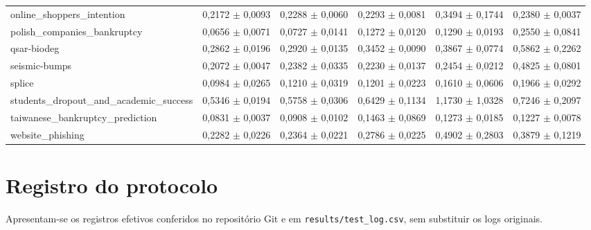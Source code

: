 \documentclass[11pt,a4paper]{article}
\begin{document}
\begin{table}[htbp]
{\begin{tabular}{@{}lrrrrr@{}}
        online\_shoppers\_intention & 0,2172 $\pm$ 0,0093 & 0,2288 $\pm$ 0,0060 & 0,2293 $\pm$ 0,0081 & 0,3494 $\pm$ 0,1744 & 0,2380 $\pm$ 0,0037 \\
        polish\_companies\_bankruptcy & 0,0656 $\pm$ 0,0071 & 0,0727 $\pm$ 0,0141 & 0,1272 $\pm$ 0,0120 & 0,1290 $\pm$ 0,0193 & 0,2550 $\pm$ 0,0841 \\
        qsar-biodeg & 0,2862 $\pm$ 0,0196 & 0,2920 $\pm$ 0,0135 & 0,3452 $\pm$ 0,0090 & 0,3867 $\pm$ 0,0774 & 0,5862 $\pm$ 0,2262 \\
        seismic-bumps & 0,2072 $\pm$ 0,0047 & 0,2382 $\pm$ 0,0335 & 0,2230 $\pm$ 0,0137 & 0,2454 $\pm$ 0,0212 & 0,4825 $\pm$ 0,0801 \\
        splice & 0,0984 $\pm$ 0,0265 & 0,1210 $\pm$ 0,0319 & 0,1201 $\pm$ 0,0223 & 0,1610 $\pm$ 0,0606 & 0,1966 $\pm$ 0,0292 \\
        students\_dropout\_and\_academic\_success & 0,5346 $\pm$ 0,0194 & 0,5758 $\pm$ 0,0306 & 0,6429 $\pm$ 0,1134 & 1,1730 $\pm$ 1,0328 & 0,7246 $\pm$ 0,2097 \\
        taiwanese\_bankruptcy\_prediction & 0,0831 $\pm$ 0,0037 & 0,0908 $\pm$ 0,0102 & 0,1463 $\pm$ 0,0869 & 0,1273 $\pm$ 0,0185 & 0,1227 $\pm$ 0,0078 \\
        website\_phishing & 0,2282 $\pm$ 0,0226 & 0,2364 $\pm$ 0,0221 & 0,2786 $\pm$ 0,0225 & 0,4902 $\pm$ 0,2803 & 0,3879 $\pm$ 0,1219 \\
        \bottomrule
    \end{tabular}%
    }
\end{table}

\section{Registro do protocolo}
\label{app:protocolo}

Apresentam-se os registros efetivos conferidos no repositório Git e em \texttt{results/test\_log.csv}, sem substituir os logs originais.
\end{document}
